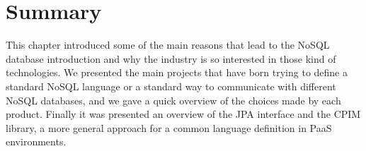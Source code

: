 \section{Summary}
This chapter introduced some of the main reasons that lead to the NoSQL database introduction and why the industry is so interested in those kind of technologies. 
\noindent We presented the main projects that have born trying to define a standard NoSQL language or a standard way to communicate with different NoSQL databases, and we gave a quick overview of the choices made by each product. 
\noindent Finally it was presented an overview of the JPA interface and the CPIM library, a more general approach for a common language definition in PaaS environments.
